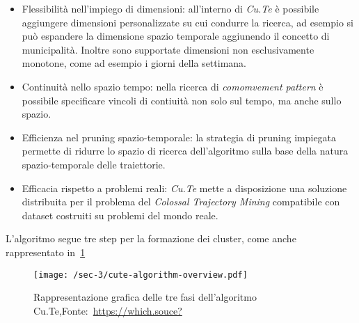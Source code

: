 \begin{itemize}

  \item Flessibilità nell'impiego di dimensioni: all'interno di \textit{Cu.Te} è possibile aggiungere
  dimensioni personalizzate su cui condurre la ricerca, ad esempio si può espandere la dimensione spazio
  temporale aggiunendo il concetto di municipalità.
  Inoltre sono supportate dimensioni non esclusivamente monotone, come ad esempio i giorni della settimana.

  \item Continuità nello spazio tempo: nella ricerca di \textit{comomvement pattern} è possibile specificare vincoli di contiuità non solo sul tempo, ma anche sullo spazio.

  \item Efficienza nel pruning spazio-temporale: la strategia di pruning impiegata permette di ridurre
  lo spazio di ricerca dell'algoritmo sulla base della natura spazio-temporale delle traiettorie.

  \item Efficacia rispetto a problemi reali: \textit{Cu.Te} mette a disposizione una soluzione distribuita per il problema del \textit{Colossal Trajectory Mining}
  compatibile con dataset costruiti su problemi del mondo reale.
\end{itemize}


L'algoritmo segue tre step per la formazione dei cluster, come anche rappresentato in~\cref{fig:chap-3:cute-overview}

  \begin{figure}
    \centering
    \texttt{[image: /sec-3/cute-algorithm-overview.pdf]}
    \caption{Rappresentazione grafica delle tre fasi dell'algoritmo Cu.Te,Fonte:~\url{https://which.souce?}}%
    \label{fig:chap-3:cute-overview}
  \end{figure}

